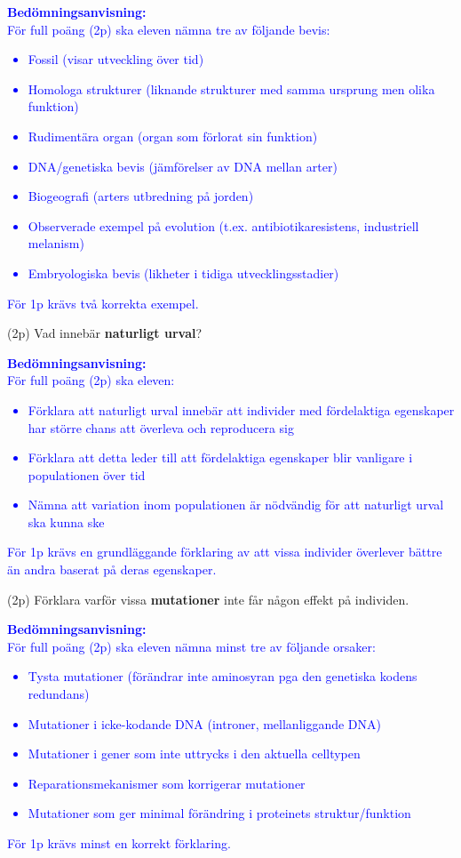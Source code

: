 \documentclass{exam}
\begin{document}
\begin{questions}
\textcolor{blue}{
\textbf{Bedömningsanvisning:}\\
För full poäng (2p) ska eleven nämna tre av följande bevis:
\begin{itemize}
\item Fossil (visar utveckling över tid)
\item Homologa strukturer (liknande strukturer med samma ursprung men olika funktion)
\item Rudimentära organ (organ som förlorat sin funktion)
\item DNA/genetiska bevis (jämförelser av DNA mellan arter)
\item Biogeografi (arters utbredning på jorden)
\item Observerade exempel på evolution (t.ex. antibiotikaresistens, industriell melanism)
\item Embryologiska bevis (likheter i tidiga utvecklingsstadier)
\end{itemize}
För 1p krävs två korrekta exempel.
}
\vspace{10mm}

\newpage

\question (2p) Vad innebär \textbf{naturligt urval}?

\textcolor{blue}{
\textbf{Bedömningsanvisning:}\\
För full poäng (2p) ska eleven:
\begin{itemize}
\item Förklara att naturligt urval innebär att individer med fördelaktiga egenskaper har större chans att överleva och reproducera sig
\item Förklara att detta leder till att fördelaktiga egenskaper blir vanligare i populationen över tid
\item Nämna att variation inom populationen är nödvändig för att naturligt urval ska kunna ske
\end{itemize}
För 1p krävs en grundläggande förklaring av att vissa individer överlever bättre än andra baserat på deras egenskaper.
}
\vspace{10mm}

\question (2p) Förklara varför vissa \textbf{mutationer} inte får någon effekt på individen.

\textcolor{blue}{
\textbf{Bedömningsanvisning:}\\
För full poäng (2p) ska eleven nämna minst tre av följande orsaker:
\begin{itemize}
\item Tysta mutationer (förändrar inte aminosyran pga den genetiska kodens redundans)
\item Mutationer i icke-kodande DNA (introner, mellanliggande DNA)
\item Mutationer i gener som inte uttrycks i den aktuella celltypen
\item Reparationsmekanismer som korrigerar mutationer
\item Mutationer som ger minimal förändring i proteinets struktur/funktion
\end{itemize}
För 1p krävs minst en korrekt förklaring.
}
\vspace{10mm}


\end{questions}
\end{document}
